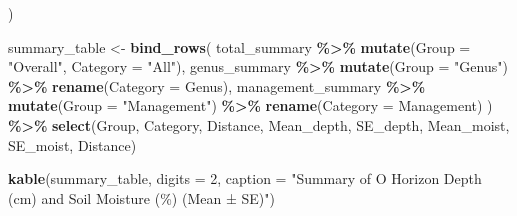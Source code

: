 \documentclass[
]{article}
\newenvironment{Shaded}{\begin{snugshade}}{\end{snugshade}}
\newcommand{\AttributeTok}[1]{\textcolor[rgb]{0.13,0.29,0.53}{#1}}
\newcommand{\DecValTok}[1]{\textcolor[rgb]{0.00,0.00,0.81}{#1}}
\newcommand{\FunctionTok}[1]{\textcolor[rgb]{0.13,0.29,0.53}{\textbf{#1}}}
\newcommand{\NormalTok}[1]{#1}
\newcommand{\OtherTok}[1]{\textcolor[rgb]{0.56,0.35,0.01}{#1}}
\newcommand{\SpecialCharTok}[1]{\textcolor[rgb]{0.81,0.36,0.00}{\textbf{#1}}}
\newcommand{\StringTok}[1]{\textcolor[rgb]{0.31,0.60,0.02}{#1}}
\begin{document}
\begin{Shaded}
\begin{Highlighting}[]
\NormalTok{  )}

\NormalTok{summary\_table }\OtherTok{\textless{}{-}} \FunctionTok{bind\_rows}\NormalTok{(}
\NormalTok{  total\_summary }\SpecialCharTok{\%\textgreater{}\%} 
    \FunctionTok{mutate}\NormalTok{(}\AttributeTok{Group =} \StringTok{"Overall"}\NormalTok{, }\AttributeTok{Category =} \StringTok{"All"}\NormalTok{), }
\NormalTok{  genus\_summary }\SpecialCharTok{\%\textgreater{}\%} 
    \FunctionTok{mutate}\NormalTok{(}\AttributeTok{Group =} \StringTok{"Genus"}\NormalTok{) }\SpecialCharTok{\%\textgreater{}\%}
    \FunctionTok{rename}\NormalTok{(}\AttributeTok{Category =}\NormalTok{ Genus), }
\NormalTok{  management\_summary }\SpecialCharTok{\%\textgreater{}\%}
    \FunctionTok{mutate}\NormalTok{(}\AttributeTok{Group =} \StringTok{"Management"}\NormalTok{) }\SpecialCharTok{\%\textgreater{}\%}
    \FunctionTok{rename}\NormalTok{(}\AttributeTok{Category =}\NormalTok{ Management)}
\NormalTok{) }\SpecialCharTok{\%\textgreater{}\%}
  \FunctionTok{select}\NormalTok{(Group, Category, Distance, Mean\_depth, SE\_depth, Mean\_moist, SE\_moist, Distance)}

\FunctionTok{kable}\NormalTok{(summary\_table, }\AttributeTok{digits =} \DecValTok{2}\NormalTok{, }\AttributeTok{caption =} \StringTok{"Summary of O Horizon Depth (cm) and Soil Moisture (\%) (Mean ± SE)"}\NormalTok{) }
\end{Highlighting}
\end{Shaded}
\end{document}
